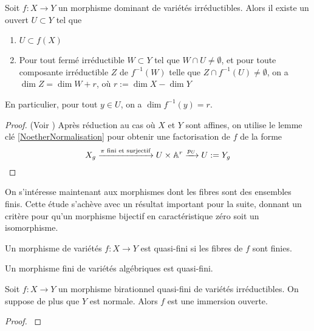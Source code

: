 \begin{thm}\label{dimensionfibres}
Soit $f:X\rightarrow Y$ un morphisme dominant de variétés irréductibles. Alors il existe un ouvert $U\subset Y$ tel que
\begin{enumerate}
\item $U\subset f(X)$
\item Pour tout fermé irréductible $W\subset Y$ tel que $W\cap U\neq \emptyset$, et pour toute composante irréductible $Z$ de $f^{-1}(W)$  telle que $Z\cap f^{-1}(U)\neq \emptyset$, on a $\dim Z=\dim W + r$, où $r:=\dim X -\dim Y$
\end{enumerate}
En particulier, pour tout $y\in U$, on a $\dim f^{-1}(y)=r.$
\end{thm}
\begin{proof}
(Voir \cite[I.8.3]{MumfordRedBook}) Après réduction au cas où $X$ et $Y$ sont affines, on utilise le lemme clé \ref{NoetherNormalisation} pour obtenir une factorisation de $f$ de la forme 
$$X_g\xrightarrow{\pi \text{ fini et surjectif}}U\times \mathbb{A}^r \xrightarrow{p_U}U:=Y_g$$
\end{proof}

On s'intéresse maintenant aux morphismes dont les fibres sont des ensembles finis. Cette étude s'achève avec un résultat important pour la suite, donnant un critère pour qu'un morphisme bijectif en caractéristique zéro soit un isomorphisme. 

\begin{defn}
Un morphisme de variétés $f:X \rightarrow Y$ est quasi-fini si les fibres de $f$ sont finies.
\end{defn}

\begin{ex}
Un morphisme fini de variétés algébriques est quasi-fini.
\end{ex}

\begin{thm}\label{ZMT}
Soit $f:X\rightarrow Y$ un morphisme birationnel quasi-fini de variétés irréductibles. On suppose de plus que $Y$ est normale. Alors $f$ est une immersion ouverte.
\end{thm}
\begin{proof}
\cite[4.4.6]{QingLiu}
\end{proof}

